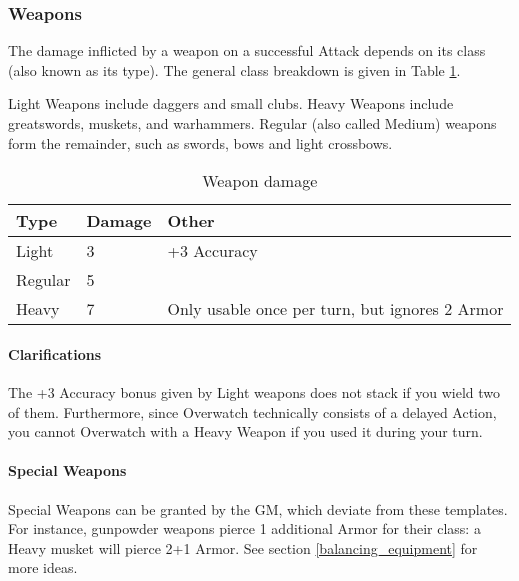 \subsubsection{Weapons}

The damage inflicted by a weapon on a successful Attack depends on its class (also known as its type). The general class breakdown is given in Table \ref{weapon_damage}. 

Light Weapons include daggers and small clubs. Heavy Weapons include greatswords, muskets, and warhammers. Regular (also called Medium) weapons form the remainder, such as swords, bows and light crossbows.

\begin{table}[h!tbp]
	\begin{center}
		\begin{tabular}{p{1.25cm}p{1.5cm}p{4cm}} \toprule
			
			\textbf{Type} & \textbf{Damage} & \textbf{Other} \\ \midrule
			
			Light & 3 & +3 Accuracy \\
			Regular & 5 & \\
			Heavy & 7 & Only usable once per turn, but ignores 2 Armor\\

			\bottomrule
		\end{tabular}
	\end{center}
	\caption{Weapon damage}
	\label{weapon_damage}
\end{table}

\paragraph{Clarifications}

The +3 Accuracy bonus given by Light weapons does not stack if you wield two of them. Furthermore, since Overwatch technically consists of a delayed Action, you cannot Overwatch with a Heavy Weapon if you used it during your turn.

\paragraph{Special Weapons} 

Special Weapons can be granted by the GM, which deviate from these templates. For instance, gunpowder weapons pierce 1 additional Armor for their class: a Heavy musket will pierce 2+1 Armor. See section \ref{balancing_equipment} for more ideas.

